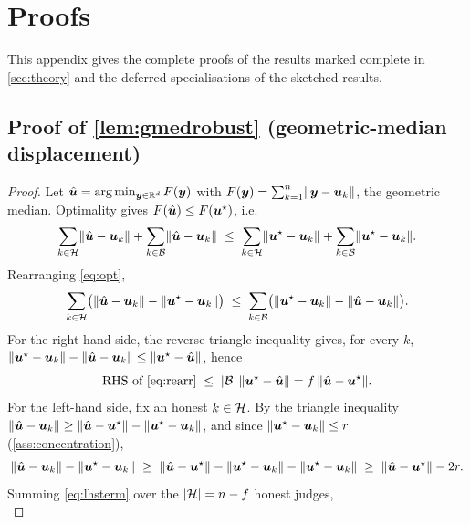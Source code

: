 \section{Proofs}
\label{app:proofs}

This appendix gives the complete proofs of the results marked complete in \cref{sec:theory}
and the deferred specialisations of the sketched results.

\subsection{Proof of \cref{lem:gmedrobust} (geometric-median displacement)}
\begin{proof}
Let $\hat{\bm{u}}=\arg\min_{\bm y\in\mathbb{R}^d} F(\bm y)$ with $F(\bm y)=\sum_{k=1}^n\lVert \bm
y-\bm{u}_k\rVert$, the geometric median. Optimality gives $F(\hat{\bm{u}})\le F(\bm{u}^{\star})$, i.e.
\begin{equation}
  \sum_{k\in\mathcal{H}}\lVert\hat{\bm{u}}-\bm{u}_k\rVert + \sum_{k\in\mathcal{B}}\lVert\hat{\bm{u}}-\bm{u}_k\rVert
  \;\le\;
  \sum_{k\in\mathcal{H}}\lVert\bm{u}^{\star}-\bm{u}_k\rVert + \sum_{k\in\mathcal{B}}\lVert\bm{u}^{\star}-\bm{u}_k\rVert .
  \label{eq:opt}
\end{equation}
Rearranging \cref{eq:opt},
\begin{equation}
  \sum_{k\in\mathcal{H}}\bigl(\lVert\hat{\bm{u}}-\bm{u}_k\rVert-\lVert\bm{u}^{\star}-\bm{u}_k\rVert\bigr)
  \;\le\;
  \sum_{k\in\mathcal{B}}\bigl(\lVert\bm{u}^{\star}-\bm{u}_k\rVert-\lVert\hat{\bm{u}}-\bm{u}_k\rVert\bigr).
  \label{eq:rearr}
\end{equation}
For the right-hand side, the reverse triangle inequality gives, for every $k$,
$\lVert\bm{u}^{\star}-\bm{u}_k\rVert-\lVert\hat{\bm{u}}-\bm{u}_k\rVert\le\lVert\bm{u}^{\star}-\hat{\bm{u}}\rVert$, hence
\begin{equation}
  \text{RHS of \eqref{eq:rearr}} \;\le\; |\mathcal{B}|\,\lVert\bm{u}^{\star}-\hat{\bm{u}}\rVert = f\,\lVert\hat{\bm{u}}-\bm{u}^{\star}\rVert.
  \label{eq:rhs}
\end{equation}
For the left-hand side, fix an honest $k\in\mathcal{H}$. By the triangle inequality
$\lVert\hat{\bm{u}}-\bm{u}_k\rVert\ge\lVert\hat{\bm{u}}-\bm{u}^{\star}\rVert-\lVert\bm{u}^{\star}-\bm{u}_k\rVert$, and since
$\lVert\bm{u}^{\star}-\bm{u}_k\rVert\le r$ (\cref{ass:concentration}),
\begin{equation}
  \lVert\hat{\bm{u}}-\bm{u}_k\rVert-\lVert\bm{u}^{\star}-\bm{u}_k\rVert
  \;\ge\; \lVert\hat{\bm{u}}-\bm{u}^{\star}\rVert - \lVert\bm{u}^{\star}-\bm{u}_k\rVert - \lVert\bm{u}^{\star}-\bm{u}_k\rVert
  \;\ge\; \lVert\hat{\bm{u}}-\bm{u}^{\star}\rVert - 2r .
  \label{eq:lhsterm}
\end{equation}
Summing \cref{eq:lhsterm} over the $|\mathcal{H}|=n-f$ honest judges,
\begin{equation}

\end{equation}
\end{proof}
